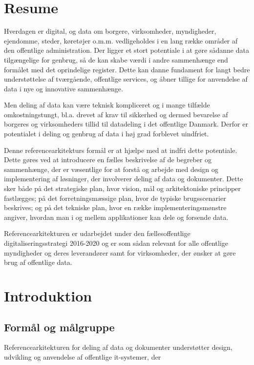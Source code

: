 
\section*{Resume}\label{resume}

Hverdagen er digital, og data om borgere, virksomheder, myndigheder,
ejendomme, steder, køretøjer o.m.m. vedligeholdes i en lang række
områder af den offentlige administration. Der ligger et stort potentiale
i at gøre sådanne data tilgængelige for genbrug, så de kan skabe værdi i
andre sammenhænge end formålet med det oprindelige register. Dette kan
danne fundament for langt bedre understøttelse af tværgående, offentlige
services, og åbner tillige for anvendelse af data i nye og innovative
sammenhænge.

Men deling af data kan være teknisk kompliceret og i mange tilfælde
omkostningstungt, bl.a. drevet af krav til sikkerhed og dermed bevarelse
af borgeres og virksomheders tillid til datadeling i det offentlige
Danmark. Derfor er potentialet i deling og genbrug af data i høj grad
forblevet uindfriet.

Denne referencearkitekturs formål er at hjælpe med at indfri dette
potentiale. Dette gøres ved at introducere en fælles beskrivelse af de
begreber og sammenhænge, der er væsentlige for at forstå og arbejde med
design og implementering af løsninger, der involverer deling af data og
dokumenter. Dette sker både på det strategiske plan, hvor vision, mål og
arkitektoniske principper fastlægges; på det forretningsmæssige plan,
hvor de typiske brugsscenarier beskrives; og på det tekniske plan, hvor
en række implementeringsmønstre angiver, hvordan man i og mellem
applikationer kan dele og forsende data.

Referencearkitekturen er udarbejdet under den fællesoffentlige
digitaliseringsstrategi 2016-2020 og er som sådan relevant for alle
offentlige myndigheder og deres leverandører samt for virksomheder, der
ønsker at gøre brug af offentlige data.

\section{Introduktion}\label{introduktion}

\subsection{Formål og målgruppe}\label{formuxe5l-og-muxe5lgruppe}

Referencearkitekturen for deling af data og dokumenter understøtter
design, udvikling og anvendelse af offentlige it-systemer, der

